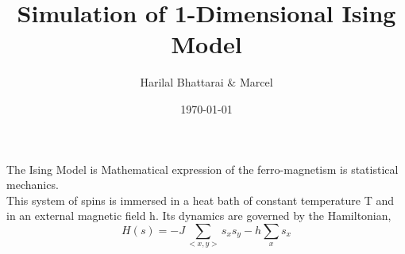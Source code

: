 \documentclass[11pt, a4paper, DIV=12]{scrartcl}
\title{Simulation of 1-Dimensional Ising Model}
\date{\today}
\author{Harilal Bhattarai \& Marcel}
\begin{document}
	\maketitle
The Ising Model is Mathematical expression of the ferro-magnetism is statistical mechanics.\\

This system of spins is immersed in a heat bath of constant temperature T and in an external magnetic field h. Its dynamics are governed by the Hamiltonian,
\begin{equation}
H(s)= -J \sum_{<x,y>}s_{x}s_{y} - h \sum_{x}s_{x}
\end{equation}
\end{document}
